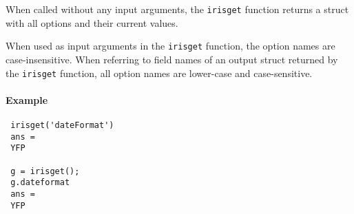  When called without any input arguments, the \texttt{irisget} function
 returns a struct with all options and their current values.
 
 When used as input arguments in the \texttt{irisget} function, the
 option names are case-insensitive. When referring to field names of an
 output struct returned by the \texttt{irisget} function, all option
 names are lower-case and case-sensitive.
 
 \paragraph{Example}
 
 \begin{verbatim}
 irisget('dateFormat')
 ans =
 YFP
 
 g = irisget();
 g.dateformat
 ans =
 YFP
 \end{verbatim}


